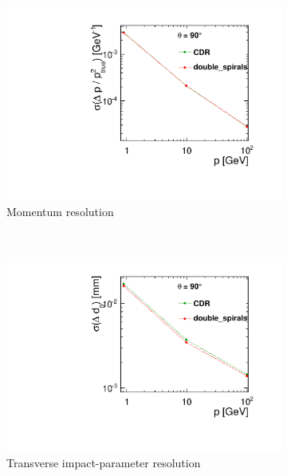 \begin{figure}[H]
        \centering
        \begin{subfigure}[b]{0.4\textwidth}
          \centering
          \includegraphics[width=\textwidth]{Figures/Geometries/pT_resolution_double.pdf}
          \caption{Momentum resolution}
          \label{}
        \end{subfigure}%
        ~ 
        \begin{subfigure}[b]{0.4\textwidth}
          \centering
          \includegraphics[width=\textwidth]{Figures/Geometries/d0_resolution_double.pdf}
          \caption{Transverse impact-parameter resolution}
          \label{}
        \end{subfigure}
        ~
        \begin{subfigure}[b]{\textwidth}

\end{subfigure}
\end{figure}
